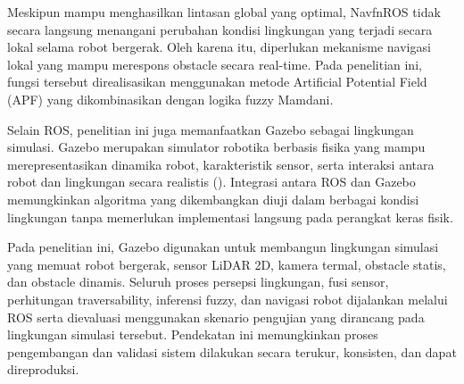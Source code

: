 Meskipun mampu menghasilkan lintasan global yang optimal, NavfnROS tidak secara langsung menangani perubahan kondisi lingkungan yang terjadi secara lokal selama robot bergerak. Oleh karena itu, diperlukan mekanisme navigasi lokal yang mampu merespons obstacle secara real-time. Pada penelitian ini, fungsi tersebut direalisasikan menggunakan metode Artificial Potential Field (APF) yang dikombinasikan dengan logika fuzzy Mamdani.

Selain ROS, penelitian ini juga memanfaatkan Gazebo sebagai lingkungan simulasi. Ga\-zebo merupakan simulator robotika berbasis fisika yang mampu merepresentasikan dinamika robot, karakteristik sensor, serta interaksi antara robot dan lingkungan secara realistis (\cite{Koenig2004}). Integrasi antara ROS dan Gazebo memungkinkan algoritma yang dikembangkan diuji dalam berbagai kondisi lingkungan tanpa memerlukan implementasi langsung pada perangkat keras fisik.

Pada penelitian ini, Gazebo digunakan untuk membangun lingkungan simulasi yang me\-muat robot bergerak, sensor LiDAR 2D, kamera termal, obstacle statis, dan obstacle dinamis. Seluruh proses persepsi lingkungan, fusi sensor, perhitungan traversability, inferensi fuzzy, dan navigasi robot dijalankan melalui ROS serta dievaluasi menggunakan skenario pengujian yang dirancang pada lingkungan simulasi tersebut. Pendekatan ini memungkinkan proses pengembangan dan validasi sistem dilakukan secara terukur, konsisten, dan dapat direproduksi.
